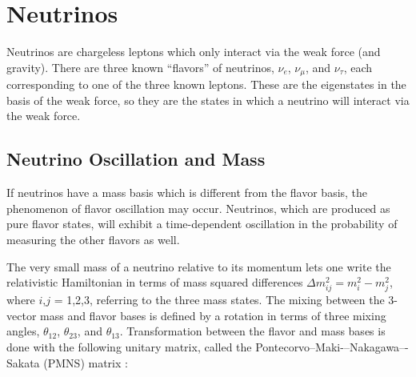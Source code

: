 \section{Neutrinos}

Neutrinos are chargeless leptons which only interact via the weak force (and gravity).  There are three known ``flavors'' of neutrinos, $\nu_{e}$, $\nu_{\mu}$, and $\nu_{\tau}$, each corresponding to one of the three known leptons.  These are the eigenstates in the basis of the weak force, so they are the states in which a neutrino will interact via the weak force.

\subsection{Neutrino Oscillation and Mass}

If neutrinos have a mass basis which is different from the flavor basis, the phenomenon of flavor oscillation may occur.  Neutrinos, which are produced as pure flavor states, will exhibit a time-dependent oscillation in the probability of measuring the other flavors as well.  

The very small mass of a neutrino relative to its momentum lets one write the relativistic Hamiltonian in terms of mass squared differences $\Delta m_{ij}^{2} = m_{i}^{2} - m_{j}^{2}$, where $i$,$j$ = 1,2,3, referring to the three mass states.  The mixing between the 3-vector mass and flavor bases is defined by a rotation in terms of three mixing angles, $\theta_{12}$, $\theta_{23}$, and $\theta_{13}$.  Transformation between the flavor and mass bases is done with the following unitary matrix, called the Pontecorvo--Maki-–Nakagawa–-Sakata (PMNS) matrix \cite{ReviewNuMass}:


